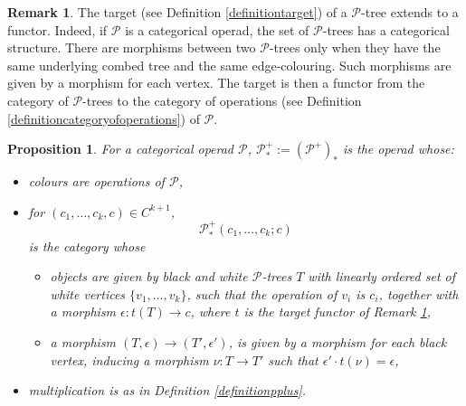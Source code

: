 \documentclass[]{amsart}
\newtheorem{proposition}[theorem]{Proposition}
\theoremstyle{definition}
\newtheorem{remark}[theorem]{Remark}
\begin{document}
\begin{remark}\label{remarktargetisfunctorial}
	The target (see Definition \ref{definitiontarget}) of a $\mathcal{P}$-tree extends to a functor. Indeed, if $\mathcal{P}$ is a categorical operad, the set of $\mathcal{P}$-trees has a categorical structure. There are morphisms between two $\mathcal{P}$-trees only when they have the same underlying combed tree and the same edge-colouring. Such morphisms are given by a morphism for each vertex. The target is then a functor from the category of $\mathcal{P}$-trees to the category of operations (see Definition \ref{definitioncategoryofoperations}) of $\mathcal{P}$.
\end{remark}





\begin{proposition}\label{propositionpplusstar}
	For a categorical operad $\mathcal{P}$, $\mathcal{P}_*^+ := (\mathcal{P}^+)_*$ is the operad whose:
	\begin{itemize}
		\item colours are operations of $\mathcal{P}$,
		\item for $(c_1,\ldots,c_k,c) \in C^{k+1}$,
		\[
		\mathcal{P}_*^+(c_1,\ldots,c_k;c)
		\]
		is the category whose
		\begin{itemize}
			\item objects are given by black and white $\mathcal{P}$-trees $T$ with linearly ordered set of white vertices $\{v_1,\ldots,v_k\}$, such that the operation of $v_i$ is $c_i$, together with a morphism $\epsilon: t(T) \to c$, where $t$ is the \emph{target functor} of Remark \ref{remarktargetisfunctorial},
			
			\item a morphism $(T,\epsilon) \to (T',\epsilon')$, is given by a morphism for each black vertex, inducing a morphism $\nu: T \to T'$ such that $\epsilon' \cdot t(\nu) = \epsilon$,
		\end{itemize}
		\item multiplication is as in Definition \ref{definitionpplus}.
	\end{itemize}
\end{proposition}
\end{document}
